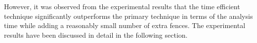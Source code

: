 However, it was observed from the experimental results that the time
efficient technique significantly outperforms the primary technique in terms of 
the analysis time while adding a reasonably small number of extra
fences. The experimental results have been discussed in detail in the 
following section.